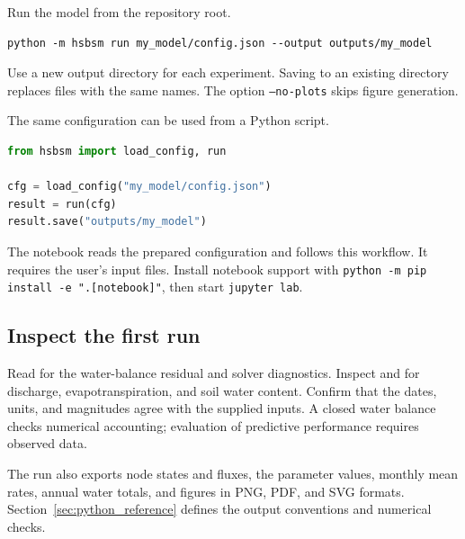 Run the model from the repository root.

\begin{lstlisting}[language={},caption={Run with the prepared catchment inputs.}]
python -m hsbsm run my_model/config.json --output outputs/my_model
\end{lstlisting}

Use a new output directory for each experiment. Saving to an existing directory replaces files with the same names. The option \texttt{--no-plots} skips figure generation.

The same configuration can be used from a Python script.

\begin{lstlisting}[language=Python,caption={Run through the Python interface.}]
from hsbsm import load_config, run

cfg = load_config("my_model/config.json")
result = run(cfg)
result.save("outputs/my_model")
\end{lstlisting}

The notebook  reads the prepared configuration and follows this workflow. It requires the user's input files. Install notebook support with \texttt{python -m pip install -e ".[notebook]"}, then start \texttt{jupyter lab}.

\subsection{Inspect the first run}

Read  for the water-balance residual and solver diagnostics. Inspect  and  for discharge, evapotranspiration, and soil water content. Confirm that the dates, units, and magnitudes agree with the supplied inputs. A closed water balance checks numerical accounting; evaluation of predictive performance requires observed data.

The run also exports node states and fluxes, the parameter values, monthly mean rates, annual water totals, and figures in PNG, PDF, and SVG formats. Section~\ref{sec:python_reference} defines the output conventions and numerical checks.

\newpage

